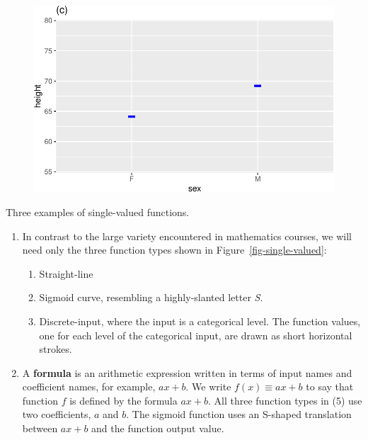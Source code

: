 \documentclass[
  letterpaper,
  DIV=11,
  numbers=noendperiod,
  oneside]{scrartcl}
\providecommand{\tightlist}{%
  \setlength{\itemsep}{0pt}\setlength{\parskip}{0pt}}\usepackage{longtable,booktabs,array}
\begin{document}
\begin{marginfigure}
{\begin{figure}[H]
\begin{minipage}{\linewidth}
\includegraphics{test-tufte_files/figure-pdf/unnamed-chunk-130-3.pdf}

\end{minipage}%

\end{figure}%

}

\caption{\label{fig-single-valued}Three examples of single-valued
functions.}

\end{marginfigure}%

\begin{enumerate}
\def\labelenumi{\arabic{enumi}.}
\setcounter{enumi}{4}
\tightlist
\item
  In contrast to the large variety encountered in mathematics courses,
  we will need only the three function types shown in
  Figure~\ref{fig-single-valued}:

  \begin{enumerate}
  \def\labelenumii{\alph{enumii}.}
  \tightlist
  \item
    Straight-line
  \item
    Sigmoid curve, resembling a highly-slanted letter \emph{S}.
  \item
    Discrete-input, where the input is a categorical level. The function
    values, one for each level of the categorical input, are drawn as
    short horizontal strokes.
  \end{enumerate}
\item
  A \textbf{formula} is an arithmetic expression written in terms of
  input names and coefficient names, for example, \(a x + b\). We write
  \(f(x) \equiv a x + b\) to say that function \(f\) is defined by the
  formula \(a x + b\). All three function types in (5) use two
  coefficients, \(a\) and \(b\). The sigmoid function uses an S-shaped
  translation between \(ax + b\) and the function output value.
\end{enumerate}
\end{document}
